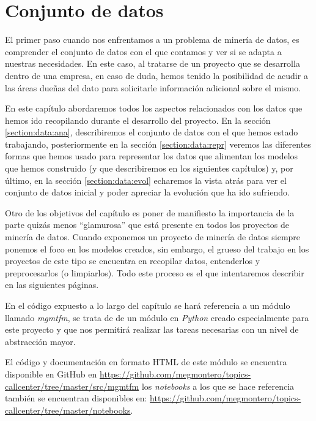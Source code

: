 \chapter{Conjunto de datos}
\label{chapter:dataset}
El primer paso cuando nos enfrentamos a un problema de minería de datos, es comprender el conjunto de datos con el que contamos y ver si se adapta a nuestras necesidades. En este caso, al tratarse de un proyecto que se desarrolla dentro de una empresa, en caso de duda, hemos tenido la posibilidad de acudir a las áreas dueñas del dato para solicitarle información adicional sobre el mismo. 


En este capítulo abordaremos todos los aspectos relacionados con los datos que hemos ido recopilando durante el desarrollo del proyecto. En la sección \ref{section:data:ana}, describiremos el conjunto de datos con el que hemos estado trabajando, posteriormente en la sección \ref{section:data:repr} veremos las diferentes formas que hemos usado para representar los datos que alimentan los modelos que hemos construido (y que describiremos en los siguientes capítulos) y, por último, en la sección \ref{section:data:evol} echaremos la vista atrás para ver el conjunto de datos inicial y poder apreciar la evolución que ha ido sufriendo.


Otro de los objetivos del capítulo es poner de manifiesto la importancia de la parte quizás menos ``glamurosa'' que está presente en todos los proyectos de minería de datos. Cuando exponemos un proyecto de minería de datos siempre ponemos el foco en los modelos creados, sin embargo, el grueso del trabajo en los proyectos de este tipo se encuentra en recopilar datos, entenderlos y preprocesarlos (o limpiarlos). Todo este proceso es el que intentaremos describir en las siguientes páginas.


En el código expuesto a lo largo del capítulo se hará referencia a un módulo llamado \textit{mgmtfm}, se trata de de un módulo en \textit{Python} creado especialmente para este proyecto y que nos permitirá realizar las tareas necesarias con un nivel de abstracción mayor. 

El código y documentación en formato HTML de este módulo se encuentra disponible en GitHub en \href{https://github.com/megmontero/topics-callcenter/tree/master/src/mgmtfm}{https://github.com/megmontero/topics-callcenter/tree/master/src/mgmtfm} los \textit{notebooks} a los que se hace referencia también se encuentran disponibles en: \href{https://github.com/megmontero/topics-callcenter/tree/master/notebooks}{https://github.com/megmontero/topics-callcenter/tree/master/notebooks}.

